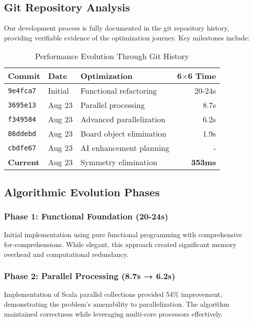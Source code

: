\documentclass[12pt,a4paper]{article}
\theoremstyle{definition}
\begin{document}
\subsection{Git Repository Analysis}

Our development process is fully documented in the git repository history, providing verifiable evidence of the optimization journey. Key milestones include:

\begin{table}[h]
\centering
\caption{Performance Evolution Through Git History}
\begin{tabular}{@{}lllr@{}}
\toprule
Commit & Date & Optimization & 6$\times$6 Time \\
\midrule
\texttt{9e4fca7} & Initial & Functional refactoring & 20-24s \\
\texttt{3695e13} & Aug 23 & Parallel processing & 8.7s \\
\texttt{f349584} & Aug 23 & Advanced parallelization & 6.2s \\
\texttt{86ddebd} & Aug 23 & Board object elimination & 1.9s \\
\texttt{cbdfe67} & Aug 23 & AI enhancement planning & - \\
\textbf{Current} & Aug 23 & Symmetry elimination & \textbf{353ms} \\
\bottomrule
\end{tabular}
\end{table}

\subsection{Algorithmic Evolution Phases}

\subsubsection{Phase 1: Functional Foundation (20-24s)}
Initial implementation using pure functional programming with comprehensive for-comprehensions. While elegant, this approach created significant memory overhead and computational redundancy.

\subsubsection{Phase 2: Parallel Processing (8.7s → 6.2s)}
Implementation of Scala parallel collections provided 54\% improvement, demonstrating the problem's amenability to parallelization. The algorithm maintained correctness while leveraging multi-core processors effectively.
\end{document}
